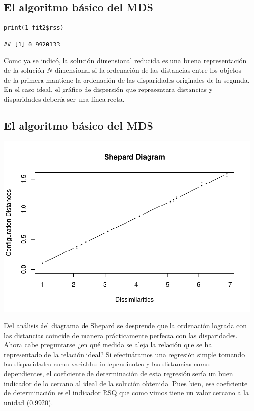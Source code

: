 \documentclass[]{article}
\begin{document}
\subsection{El algoritmo básico del
MDS}\label{el-algoritmo-buxe1sico-del-mds-11}

\hypertarget{left}{}
\begin{verbatim}
print(1-fit2$rss)
\end{verbatim}

\begin{verbatim}
## [1] 0.9920133
\end{verbatim}

\hypertarget{right}{}
Como ya se indicó, la solución dimensional reducida es una buena
representación de la solución \(N\) dimensional si la ordenación de las
distancias entre los objetos de la primera mantiene la ordenación de las
disparidades originales de la segunda. En el caso ideal, el gráfico de
dispersión que representara distancias y disparidades debería ser una
línea recta.

\subsection{El algoritmo básico del
MDS}\label{el-algoritmo-buxe1sico-del-mds-12}

\hypertarget{left}{}
\includegraphics{Clase-4_files/figure-latex/unnamed-chunk-16-1.pdf}

\hypertarget{right}{}
Del análisis del diagrama de Shepard se desprende que la ordenación
lograda con las distancias coincide de manera prácticamente perfecta con
las disparidades. Ahora cabe preguntarse ¿en qué medida se aleja la
relación que se ha representado de la relación ideal? Si efectuáramos
una regresión simple tomando las disparidades como variables
independientes y las distancias como dependientes, el coeficiente de
determinación de esta regresión sería un buen indicador de lo cercano al
ideal de la solución obtenida. Pues bien, ese coeficiente de
determinación es el indicador RSQ que como vimos tiene un valor cercano
a la unidad (0.9920).
\end{document}
